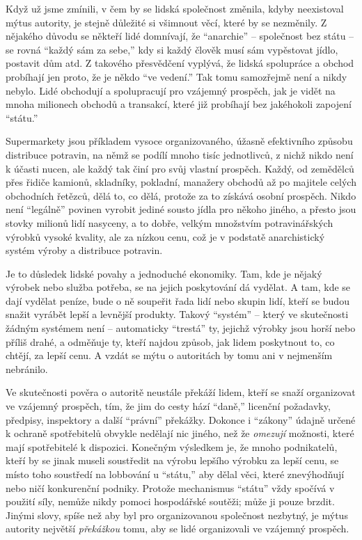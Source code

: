 \documentclass{book}
\begin{document}
Když už jsme zmínili, v čem by se lidská společnost změnila, kdyby neexistoval mýtus autority, je stejně důležité si všimnout věcí, které by se nezměnily. Z nějakého důvodu se někteří lidé domnívají, že \enquote{anarchie} -- společnost bez státu -- se rovná \enquote{každý sám za sebe,} kdy si každý člověk musí sám vypěstovat jídlo, postavit dům atd. Z takového přesvědčení vyplývá, že lidská spolupráce a obchod probíhají jen proto, že je někdo \enquote{ve vedení.} Tak tomu samozřejmě není a nikdy nebylo. Lidé obchodují a spolupracují pro vzájemný prospěch, jak je vidět na mnoha milionech obchodů a transakcí, které již probíhají bez jakéhokoli zapojení \enquote{státu.}

Supermarkety jsou příkladem vysoce organizovaného, úžasně efektivního způsobu distribuce potravin, na němž se podílí mnoho tisíc jednotlivců, z nichž nikdo není k účasti nucen, ale každý tak činí pro svůj vlastní prospěch. Každý, od zemědělců přes řidiče kamionů, skladníky, pokladní, manažery obchodů až po majitele celých obchodních řetězců, dělá to, co dělá, protože za to získává osobní prospěch. Nikdo není \enquote{legálně} povinen vyrobit jediné sousto jídla pro někoho jiného, a přesto jsou stovky milionů lidí nasyceny, a to dobře, velkým množstvím potravinářských výrobků vysoké kvality, ale za nízkou cenu, což je v podstatě anarchistický systém výroby a distribuce potravin.

Je to důsledek lidské povahy a jednoduché ekonomiky. Tam, kde je nějaký výrobek nebo služba potřeba, se na jejich poskytování dá vydělat. A tam, kde se dají vydělat peníze, bude o ně soupeřit řada lidí nebo skupin lidí, kteří se budou snažit vyrábět lepší a levnější produkty. Takový \enquote{systém} -- který ve skutečnosti žádným systémem není -- automaticky \enquote{trestá} ty, jejichž výrobky jsou horší nebo příliš drahé, a odměňuje ty, kteří najdou způsob, jak lidem poskytnout to, co chtějí, za lepší cenu. A vzdát se mýtu o autoritách by tomu ani v nejmenším nebránilo.

Ve skutečnosti pověra o autoritě neustále překáží lidem, kteří se snaží organizovat ve vzájemný prospěch, tím, že jim do cesty hází \enquote{daně,} licenční požadavky, předpisy, inspektory a další \enquote{právní} překážky. Dokonce i \enquote{zákony} údajně určené k ochraně spotřebitelů obvykle nedělají nic jiného, než že \emph{omezují} možnosti, které mají spotřebitelé k dispozici. Konečným výsledkem je, že mnoho podnikatelů, kteří by se jinak museli soustředit na výrobu lepšího výrobku za lepší cenu, se místo toho soustředí na lobbování u \enquote{státu,} aby dělal věci, které znevýhodňují nebo ničí konkurenční podniky. Protože mechanismus \enquote{státu} vždy spočívá v použití síly, nemůže nikdy pomoci hospodářské soutěži; může ji pouze brzdit. Jinými slovy, spíše než aby byl pro organizovanou společnost nezbytný, je mýtus autority největší \emph{překážkou} tomu, aby se lidé organizovali ve vzájemný prospěch.
\end{document}

